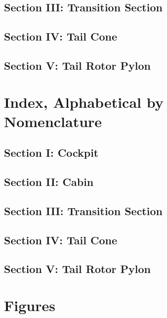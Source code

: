 \documentclass[letterpaper,11pt,openany,oneside]{book}
\begin{document}
\section{Section III: Transition Section}

\clearpage
\section{Section IV: Tail Cone}

\clearpage
\section{Section V: Tail Rotor Pylon}

\chapter{Index, Alphabetical by Nomenclature}
\section{Section I: Cockpit}

\clearpage
\section{Section II: Cabin}

\clearpage
\section{Section III: Transition Section}

\clearpage
\section{Section IV: Tail Cone}

\clearpage
\section{Section V: Tail Rotor Pylon}


\renewcommand{\thefigure}{\arabic{figure}}
\setcounter{figure}{0}
\captionsetup{format=hang,labelformat=default,labelsep=endash}
\chapter{Figures}

\end{document}

